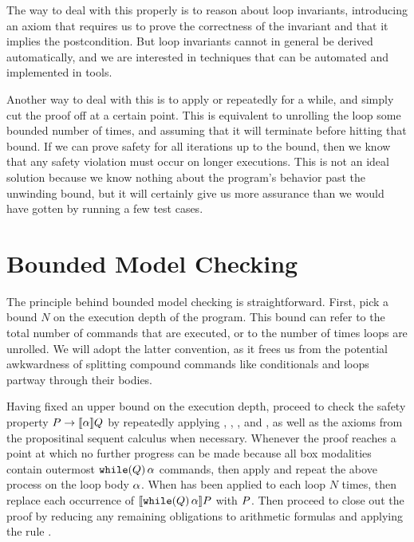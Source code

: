 \documentclass[11pt,twoside]{scrartcl}
\begin{document}
The way to deal with this properly is to reason about loop invariants, introducing an axiom that requires us to prove the correctness of the invariant and that it implies the postcondition. But loop invariants cannot in general be derived automatically, and we are interested in techniques that can be automated and implemented in tools.

Another way to deal with this is to apply  or  repeatedly for a while, and simply cut the proof off at a certain point. This is equivalent to unrolling the loop some bounded number of times, and assuming that it will terminate before hitting that bound. If we can prove safety for all iterations up to the bound, then we know that any safety violation must occur on longer executions. This is not an ideal solution because we know nothing about the program's behavior past the unwinding bound, but it will certainly give us more assurance than we would have gotten by running a few test cases.

\section{Bounded Model Checking}

The principle behind bounded model checking is straightforward. First, pick a bound $N$ on the execution depth of the program. This bound can refer to the total number of commands that are executed, or to the number of times loops are unrolled. We will adopt the latter convention, as it frees us from the potential awkwardness of splitting compound commands like conditionals and loops partway through their bodies.

Having fixed an upper bound on the execution depth, proceed to check the safety property $\ausfml \limply \dbox{\asprg}{\busfml}$ by repeatedly applying , , , and , as well as the axioms from the propositinal sequent calculus when necessary. Whenever the proof reaches a point at which no further progress can be made because all box modalities contain outermost $\texttt{\upshape while}(Q)\,\alpha$ commands, then apply  and repeat the above process on the loop body $\alpha$. When  has been applied to each loop $N$ times, then replace each occurrence of $\dbox{\pwhile{\ivr}{\asprg}}{\ausfml}$ with $P$. Then proceed to close out the proof by reducing any remaining obligations to arithmetic formulas and applying the rule .
\end{document}
